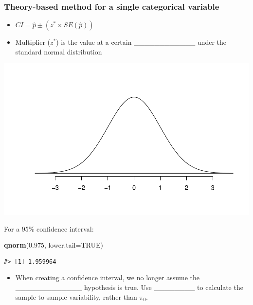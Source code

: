 \documentclass[
]{report}
\newenvironment{Shaded}{\begin{snugshade}}{\end{snugshade}}
\newcommand{\AttributeTok}[1]{\textcolor[rgb]{0.13,0.29,0.53}{#1}}
\newcommand{\ConstantTok}[1]{\textcolor[rgb]{0.56,0.35,0.01}{#1}}
\newcommand{\FloatTok}[1]{\textcolor[rgb]{0.00,0.00,0.81}{#1}}
\newcommand{\FunctionTok}[1]{\textcolor[rgb]{0.13,0.29,0.53}{\textbf{#1}}}
\newcommand{\NormalTok}[1]{#1}
\providecommand{\tightlist}{%
  \setlength{\itemsep}{0pt}\setlength{\parskip}{0pt}}
\begin{document}
\vspace{0.5in}

\subsubsection*{Theory-based method for a single categorical variable}\label{theory-based-method-for-a-single-categorical-variable}

\begin{itemize}
\item
  \(CI = \hat{p} \pm (z^* \times SE(\hat{p}))\)
\item
  Multiplier (\(z^*\)) is the value at a certain \_\_\_\_\_\_\_\_\_\_\_\_ under the standard normal distribution
\end{itemize}

\begin{center}\includegraphics[width=0.5\linewidth]{04-VN04-1cat_theory_files/figure-latex/standardNormalcur-1} \end{center}

For a 95\% confidence interval:

\begin{Shaded}
\begin{Highlighting}[]
\FunctionTok{qnorm}\NormalTok{(}\FloatTok{0.975}\NormalTok{, }\AttributeTok{lower.tail=}\ConstantTok{TRUE}\NormalTok{)}
\end{Highlighting}
\end{Shaded}

\begin{verbatim}
#> [1] 1.959964
\end{verbatim}


\begin{itemize}
\tightlist
\item
  When creating a confidence interval, we no longer assume the \_\_\_\_\_\_\_\_\_\_\_\_\_ hypothesis is true. Use \_\_\_\_\_\_\_\_ to calculate the sample to sample variability, rather than \(\pi_0\).
\end{itemize}
\end{document}

